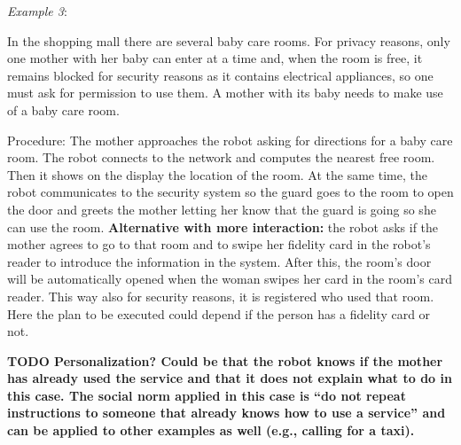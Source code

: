 





\textit{Example 3}:
 
In the shopping mall there are several baby care rooms. For privacy reasons, only one mother with her baby can enter at a time and, when the room is free, it remains blocked for security reasons as it contains electrical appliances, so one must ask for permission to use them. 
A mother with its baby needs to make use of a baby care room.

Procedure: 
The mother approaches the robot asking for directions for a baby care room. The robot connects to the network and computes the nearest free room. Then it shows on the display the location of the room. At the same time, the robot communicates to the security system so the guard goes to the room to open the door and greets the mother letting her know that the guard is going so she can use the room. \textbf{Alternative with more interaction:} the robot asks if the mother agrees to go to that room and to swipe her fidelity card in the robot's reader to introduce the information in the system. After this, the room's door will be automatically opened when the woman swipes her card in the room's card reader. This way also for security reasons, it is registered who used that room.
{\color{blue} Here the plan to be executed could depend if the person has a fidelity card or not.}


{\bf TODO Personalization? Could be that the robot knows if the mother has already used the service and that it does not explain what to do in this case. The social norm applied in this case is ``do not repeat instructions to someone that already knows how to use a service''
and can be applied to other examples as well (e.g., calling for a taxi).}








